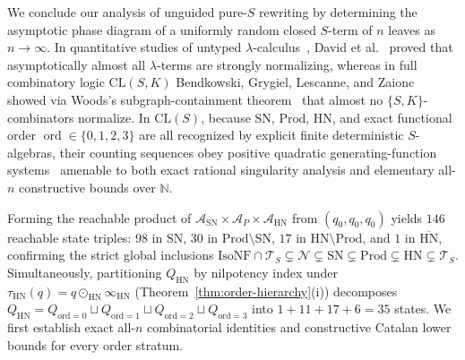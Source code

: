 \documentclass[11pt,reqno]{amsart}
\numberwithin{equation}{section}
\theoremstyle{plain}
\theoremstyle{definition}
\theoremstyle{remark}
\DeclareMathOperator{\ord}{ord}
\newcommand{\CLS}{\mathrm{CL}(S)}
\newcommand{\TS}{\mathcal{T}_S}
\newcommand{\SN}{\mathrm{SN}}
\newcommand{\HN}{\mathrm{HN}}
\newcommand{\Prod}{\mathrm{Prod}}
\begin{document}
We conclude our analysis of unguided pure-$S$ rewriting by determining the asymptotic phase diagram of a uniformly random closed $S$-term of $n$ leaves as $n \to \infty$. In quantitative studies of untyped $\lambda$-calculus~\cite{BodiniGardyGittenberger2011,GrygielLescanne2013,BodiniGardyGittenbergerJacquot2013,DavidGrygielKozikRaffalliTheyssierZaionc2013}, David et al.~\cite{DavidGrygielKozikRaffalliTheyssierZaionc2013} proved that asymptotically almost all $\lambda$-terms are strongly normalizing, whereas in full combinatory logic $\mathrm{CL}(S, K)$ Bendkowski, Grygiel, Lescanne, and Zaionc~\cite{BendkowskiGrygielZaionc2015,BendkowskiGrygielZaionc2017,BendkowskiGrygielLescanneZaionc2017} showed via Woods's subgraph-containment theorem~\cite{Woods1998} that almost no $\{S, K\}$-combinators normalize. In $\CLS$, because $\SN$, $\Prod$, $\HN$, and exact functional order $\ord \in \{0, 1, 2, 3\}$ are all recognized by explicit finite deterministic $S$-algebras, their counting sequences obey positive quadratic generating-function systems~\cite{Drmota1997,FlajoletSedgewick2009} amenable to both exact rational singularity analysis and elementary all-$n$ constructive bounds over $\mathbb{N}$.

Forming the reachable product of $\mathcal{A}_{\SN} \times \mathcal{A}_P \times \mathcal{A}_{\HN}$ from $(q_0, q_0, q_0)$ yields $146$ reachable state triples: $98$ in $\SN$, $30$ in $\Prod \setminus \SN$, $17$ in $\HN \setminus \Prod$, and $1$ in $\overline{\HN}$, confirming the strict global inclusions $\mathrm{IsoNF} \cap \TS \subsetneq \mathcal{N} \subsetneq \SN \subsetneq \Prod \subsetneq \HN \subsetneq \TS$. Simultaneously, partitioning $Q_{\HN}$ by nilpotency index under $\tau_{\HN}(q) = q \odot_{\HN} \infty_{\HN}$ (Theorem~\ref{thm:order-hierarchy}(i)) decomposes $Q_{\HN} = Q_{\mathrm{ord}=0} \sqcup Q_{\mathrm{ord}=1} \sqcup Q_{\mathrm{ord}=2} \sqcup Q_{\mathrm{ord}=3}$ into $1 + 11 + 17 + 6 = 35$ states. We first establish exact all-$n$ combinatorial identities and constructive Catalan lower bounds for every order stratum.
\end{document}
